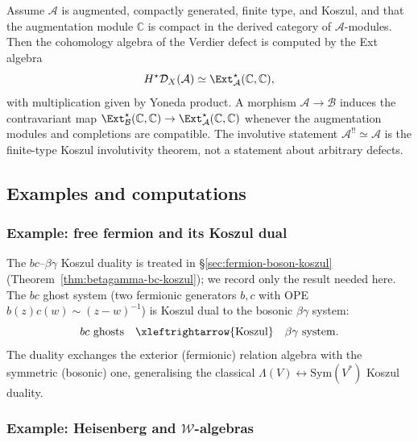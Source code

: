 \begin{theorem}\label{thm:universal-defect-construction}
Assume $\mathcal A$ is augmented, compactly generated, finite type, and
Koszul, and that the augmentation module $\mathbb C$ is compact in the
derived category of $\mathcal A$-modules.  Then the cohomology algebra
of the Verdier defect is computed by the Ext algebra
\[
H^\star\mathcal D_X(\mathcal A)
\simeq
\Ext^\star_{\mathcal A}(\mathbb C,\mathbb C),
\]
with multiplication given by Yoneda product.  A morphism
$\mathcal A\to\mathcal B$ induces the contravariant map
$\Ext^\star_{\mathcal B}(\mathbb C,\mathbb C)
\to
\Ext^\star_{\mathcal A}(\mathbb C,\mathbb C)$ whenever the
augmentation modules and completions are compatible.  The involutive
statement $\mathcal A^{!!}\simeq\mathcal A$ is the finite-type Koszul
involutivity theorem, not a statement about arbitrary defects.
\end{theorem}

\subsection{Examples and computations}

\subsubsection{Example: free fermion and its Koszul dual}

\begin{example}
The $bc$--$\beta\gamma$ Koszul duality is treated in
\S\ref{sec:fermion-boson-koszul}
(Theorem~\ref{thm:betagamma-bc-koszul}); we record only the
result needed here. The $bc$ ghost system (two fermionic generators
$b, c$ with OPE $b(z)c(w) \sim (z-w)^{-1}$) is Koszul dual to the
bosonic $\beta\gamma$ system:
\[
 bc \text{ ghosts}
 \quad \xleftrightarrow{\text{Koszul}} \quad
 \beta\gamma \text{ system.}
\]
The duality exchanges the exterior (fermionic) relation algebra with
the symmetric (bosonic) one, generalising the classical
$\Lambda(V) \leftrightarrow \mathrm{Sym}(V^*)$ Koszul duality.
\end{example}

\subsubsection{Example: Heisenberg and $\mathcal{W}$-algebras}

